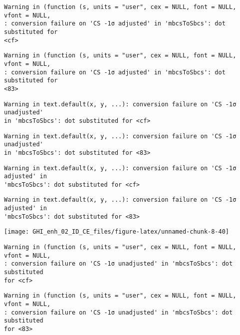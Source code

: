 \documentclass[
  10pt,
  a4paper,oneside]{article}
\begin{document}
\begin{verbatim}
Warning in (function (s, units = "user", cex = NULL, font = NULL, vfont = NULL,
: conversion failure on 'CS -1σ adjusted' in 'mbcsToSbcs': dot substituted for
<cf>
\end{verbatim}

\begin{verbatim}
Warning in (function (s, units = "user", cex = NULL, font = NULL, vfont = NULL,
: conversion failure on 'CS -1σ adjusted' in 'mbcsToSbcs': dot substituted for
<83>
\end{verbatim}

\begin{verbatim}
Warning in text.default(x, y, ...): conversion failure on 'CS -1σ unadjusted'
in 'mbcsToSbcs': dot substituted for <cf>
\end{verbatim}

\begin{verbatim}
Warning in text.default(x, y, ...): conversion failure on 'CS -1σ unadjusted'
in 'mbcsToSbcs': dot substituted for <83>
\end{verbatim}

\begin{verbatim}
Warning in text.default(x, y, ...): conversion failure on 'CS -1σ adjusted' in
'mbcsToSbcs': dot substituted for <cf>
\end{verbatim}

\begin{verbatim}
Warning in text.default(x, y, ...): conversion failure on 'CS -1σ adjusted' in
'mbcsToSbcs': dot substituted for <83>
\end{verbatim}

\begin{center}\texttt{[image: GHI\_enh\_02\_ID\_CE\_files/figure-latex/unnamed-chunk-8-40]} \end{center}

\begin{verbatim}
Warning in (function (s, units = "user", cex = NULL, font = NULL, vfont = NULL,
: conversion failure on 'CS -1σ unadjusted' in 'mbcsToSbcs': dot substituted
for <cf>
\end{verbatim}

\begin{verbatim}
Warning in (function (s, units = "user", cex = NULL, font = NULL, vfont = NULL,
: conversion failure on 'CS -1σ unadjusted' in 'mbcsToSbcs': dot substituted
for <83>
\end{verbatim}
\end{document}
